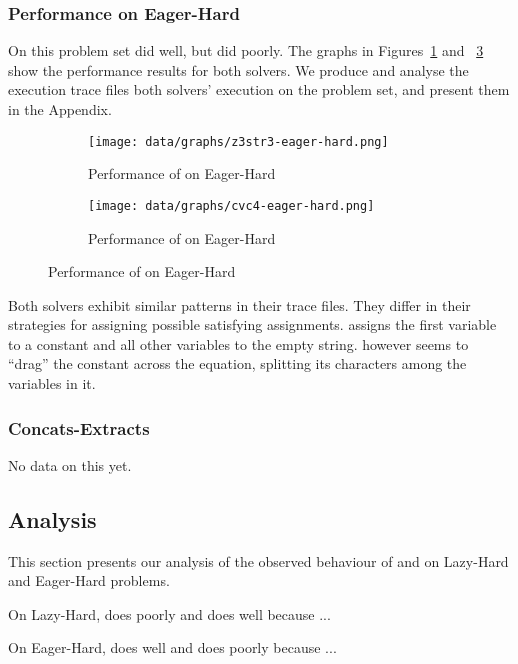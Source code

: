 
        \subsubsection{Performance on Eager-Hard}

            On this problem set \cvc{} did well, but \us{} did poorly. The graphs in Figures~\ref{fig:z3str3-eager-hard} and ~\ref{fig:cvc4-eager-hard} show the performance results for both solvers. We produce and analyse the execution trace files both solvers' execution on the problem set, and present them in the Appendix.

            \begin{figure}[h]
                \begin{subfigure}{.5\textwidth}
                    \texttt{[image: data/graphs/z3str3-eager-hard.png]}
                    \caption{Performance of \us{} on Eager-Hard}
                    \label{fig:z3str3-eager-hard}
                \end{subfigure}
                \begin{subfigure}{.5\textwidth}
                    \texttt{[image: data/graphs/cvc4-eager-hard.png]}
                    \caption{Performance of \cvc{} on Eager-Hard}
                    \label{fig:cvc4-eager-hard}
                \end{subfigure}
            \end{figure}

            Both solvers exhibit similar patterns in their trace files. They differ in their strategies for assigning possible satisfying assignments. \cvc{} assigns the first variable to a constant and all other variables to the empty string. \us{} however seems to ``drag'' the constant across the equation, splitting its characters among the variables in it.


        \subsubsection{Concats-Extracts}

            No data on this yet.

    \subsection{Analysis}

        This section presents our analysis of the observed behaviour of \cvc{} and \us{} on Lazy-Hard and Eager-Hard problems.

        On Lazy-Hard, \cvc{} does poorly and \us{} does well because ...

        On Eager-Hard, \cvc{} does well and \us{} does poorly because ...
